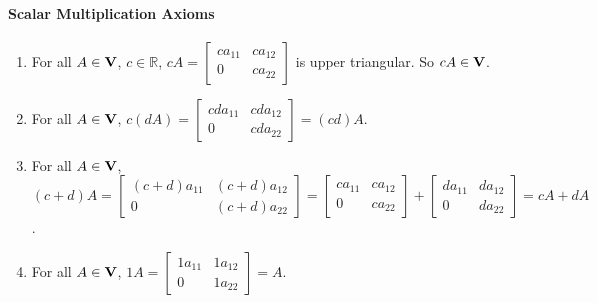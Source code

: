\documentclass[10pt,addpoints,answers]{exam}
\begin{document}
\begin{questions}
\begin{parts}
{    \paragraph{Scalar Multiplication Axioms}
    \begin{enumerate}
      \item For all $A \in {\bf V}$, $c \in \mathbb{R}$, $cA = \begin{bmatrix}
        ca_{11} & ca_{12} \\
        0 & ca_{22}
      \end{bmatrix}$ is upper triangular. So $cA \in {\bf V}$.
      \item For all $A \in {\bf V}$, $c(dA) = \begin{bmatrix}
        cda_{11} & cda_{12} \\
        0 & cda_{22}
      \end{bmatrix} = (cd)A$.
      \item For all $A \in {\bf V}$, $(c+d)A = \begin{bmatrix}
        (c+d)a_{11} & (c+d)a_{12} \\
        0 & (c+d)a_{22} \end{bmatrix} = \begin{bmatrix}
          ca_{11} & ca_{12} \\
          0 & ca_{22}
        \end{bmatrix} + \begin{bmatrix}
          da_{11} & da_{12} \\
          0 & da_{22}
        \end{bmatrix} = cA + dA$.
      \item For all $A \in {\bf V}$, $1A = \begin{bmatrix}
        1a_{11} & 1a_{12} \\
        0 & 1a_{22}
      \end{bmatrix} = A$.
    \end{enumerate}

 }

 \end{parts}
\end{questions}
\end{document}
